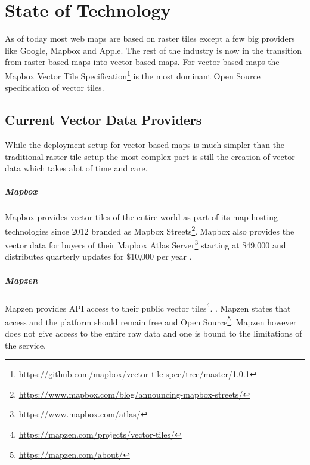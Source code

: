 \chapter{State of Technology}

As of today most web maps are based on raster tiles except a few big providers like Google, Mapbox and Apple.
The rest of the industry is now in the transition from raster based maps into vector based maps. For vector based maps the Mapbox Vector Tile Specification\footnote{\url{https://github.com/mapbox/vector-tile-spec/tree/master/1.0.1}} is the most dominant Open Source specification of vector tiles.

\section{Current Vector Data Providers}

While the deployment setup for vector based maps is much simpler than
the traditional raster tile setup the most complex part is still
the creation of vector data which takes alot of time and care.

\paragraph{Mapbox}

Mapbox provides vector tiles of the entire world as part of its
map hosting technologies since 2012 branded as Mapbox Streets\footnote{\url{https://www.mapbox.com/blog/announcing-mapbox-streets/}}. Mapbox also provides the vector data for buyers of their Mapbox Atlas Server\footnote{\url{https://www.mapbox.com/atlas/}} starting at \$49,000 and distributes quarterly updates for \$10,000 per year .

\paragraph{Mapzen}

Mapzen provides API access to their public vector tiles\footnote{\url{https://mapzen.com/projects/vector-tiles/}}.
. Mapzen states that access and the platform should remain free and Open Source\footnote{\url{https://mapzen.com/about/}}. Mapzen however
does not give access to the entire raw data and one is bound to
the limitations of the service.

